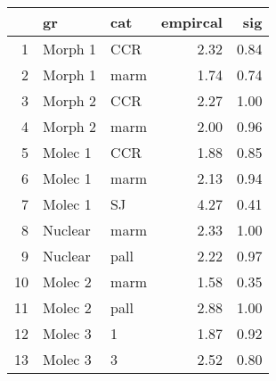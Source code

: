 \begin{table}[ht]
\centering
\begin{tabular}{rllrr}
  \hline
 & gr & cat & empircal & sig \\ 
  \hline
1 & Morph 1 & CCR & 2.32 & 0.84 \\ 
  2 & Morph 1 & marm & 1.74 & 0.74 \\ 
  3 & Morph 2 & CCR & 2.27 & 1.00 \\ 
  4 & Morph 2 & marm & 2.00 & 0.96 \\ 
  5 & Molec 1 & CCR & 1.88 & 0.85 \\ 
  6 & Molec 1 & marm & 2.13 & 0.94 \\ 
  7 & Molec 1 & SJ & 4.27 & 0.41 \\ 
  8 & Nuclear & marm & 2.33 & 1.00 \\ 
  9 & Nuclear & pall & 2.22 & 0.97 \\ 
  10 & Molec 2 & marm & 1.58 & 0.35 \\ 
  11 & Molec 2 & pall & 2.88 & 1.00 \\ 
  12 & Molec 3 & 1 & 1.87 & 0.92 \\ 
  13 & Molec 3 & 3 & 2.52 & 0.80 \\ 
   \hline
\end{tabular}
\label{mmmiss}
\end{table}
